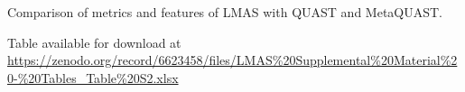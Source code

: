 \begin{table}[]
\centering
\caption{Comparison of metrics and features of LMAS with QUAST and MetaQUAST.}
\label{tab:ch5_suptable2}
Table available for download at \url{https://zenodo.org/record/6623458/files/LMAS\%20Supplemental\%20Material\%20-\%20Tables_Table\%20S2.xlsx}
\end{table}